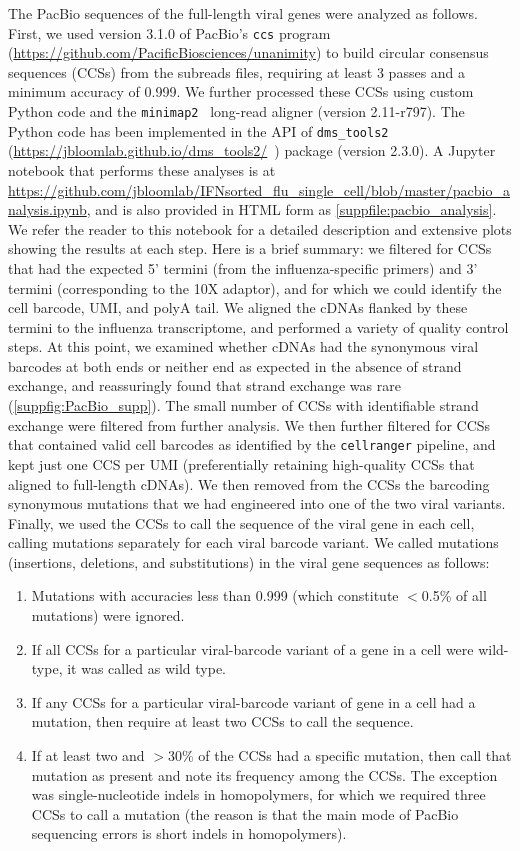 \documentclass[10pt,letterpaper]{article}
\newcommand{\SUPPFILE}[1]{\autoref{suppfile:#1}}
\newcommand{\SUPPFIG}[1]{\autoref{suppfig:#1}}
\begin{document}
The PacBio sequences of the full-length viral genes were analyzed as follows.
First, we used version 3.1.0 of PacBio's \texttt{ccs} program (\url{https://github.com/PacificBiosciences/unanimity}) to build circular consensus sequences (CCSs) from the subreads files, requiring at least 3 passes and a minimum accuracy of 0.999.
We further processed these CCSs using custom Python code and the \texttt{minimap2}~\citep{li2018minimap2} long-read aligner (version 2.11-r797).
The Python code has been implemented in the API of \texttt{dms\_tools2} (\url{https://jbloomlab.github.io/dms_tools2/}~\citep{bloom2015software}) package (version 2.3.0).
A Jupyter notebook that performs these analyses is at \url{https://github.com/jbloomlab/IFNsorted_flu_single_cell/blob/master/pacbio_analysis.ipynb}, and is also provided in HTML form as \SUPPFILE{pacbio_analysis}.
We refer the reader to this notebook for a detailed description and extensive plots showing the results at each step.
Here is a brief summary: we filtered for CCSs that had the expected 5' termini (from the influenza-specific primers) and 3' termini (corresponding to the 10X adaptor), and for which we could identify the cell barcode, UMI, and polyA tail.
We aligned the cDNAs flanked by these termini to the influenza transcriptome, and performed a variety of quality control steps.
At this point, we examined whether cDNAs had the synonymous viral barcodes at both ends or neither end as expected in the absence of strand exchange, and reassuringly found that strand exchange was rare (\SUPPFIG{PacBio_supp}).
The small number of CCSs with identifiable strand exchange were filtered from further analysis.
We then further filtered for CCSs that contained valid cell barcodes as identified by the \texttt{cellranger} pipeline, and kept just one CCS per UMI (preferentially retaining high-quality CCSs that aligned to full-length cDNAs).
We then removed from the CCSs the barcoding synonymous mutations that we had engineered into one of the two viral variants.
Finally, we used the CCSs to call the sequence of the viral gene in each cell, calling mutations separately for each viral barcode variant.
We called mutations (insertions, deletions, and substitutions) in the viral gene sequences as follows:
\begin{enumerate}
\item Mutations with accuracies less than 0.999 (which constitute $<$0.5\% of all mutations) were ignored.
\item If all CCSs for a particular viral-barcode variant of a gene in a cell were wild-type, it was called as wild type.
\item If any CCSs for a particular viral-barcode variant of gene in a cell had a mutation, then require at least two CCSs to call the sequence.
\item If at least two and $>$30\% of the CCSs had a specific mutation, then call that mutation as present and note its frequency among the CCSs. The exception was single-nucleotide indels in homopolymers, for which we required three CCSs to call a mutation (the reason is that the main mode of PacBio sequencing errors is short indels in homopolymers).
\end{enumerate}
\end{document}
